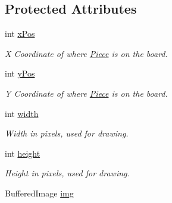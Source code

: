 \subsection*{Protected Attributes}
\begin{DoxyCompactItemize}
\item 
\hypertarget{classapplication_1_1_piece_af7a78ee6a0bbbee54b0bf385ab3eda43}{int \hyperlink{classapplication_1_1_piece_af7a78ee6a0bbbee54b0bf385ab3eda43}{x\+Pos}}\label{classapplication_1_1_piece_af7a78ee6a0bbbee54b0bf385ab3eda43}

\begin{DoxyCompactList}\small\item\em X Coordinate of where \hyperlink{classapplication_1_1_piece}{Piece} is on the board. \end{DoxyCompactList}\item 
\hypertarget{classapplication_1_1_piece_a11da2d0872e6553217daa56a851c7740}{int \hyperlink{classapplication_1_1_piece_a11da2d0872e6553217daa56a851c7740}{y\+Pos}}\label{classapplication_1_1_piece_a11da2d0872e6553217daa56a851c7740}

\begin{DoxyCompactList}\small\item\em Y Coordinate of where \hyperlink{classapplication_1_1_piece}{Piece} is on the board. \end{DoxyCompactList}\item 
\hypertarget{classapplication_1_1_piece_a8885ca50301c6e85d333f397ad106a6b}{int \hyperlink{classapplication_1_1_piece_a8885ca50301c6e85d333f397ad106a6b}{width}}\label{classapplication_1_1_piece_a8885ca50301c6e85d333f397ad106a6b}

\begin{DoxyCompactList}\small\item\em Width in pixels, used for drawing. \end{DoxyCompactList}\item 
\hypertarget{classapplication_1_1_piece_af7f74a095a34bf775cc6b44e5ea1dcbe}{int \hyperlink{classapplication_1_1_piece_af7f74a095a34bf775cc6b44e5ea1dcbe}{height}}\label{classapplication_1_1_piece_af7f74a095a34bf775cc6b44e5ea1dcbe}

\begin{DoxyCompactList}\small\item\em Height in pixels, used for drawing. \end{DoxyCompactList}\item 
\hypertarget{classapplication_1_1_piece_a423e3460410ce4199060a42812c79463}{Buffered\+Image \hyperlink{classapplication_1_1_piece_a423e3460410ce4199060a42812c79463}{img}}\label{classapplication_1_1_piece_a423e3460410ce4199060a42812c79463}


\end{DoxyCompactItemize}
